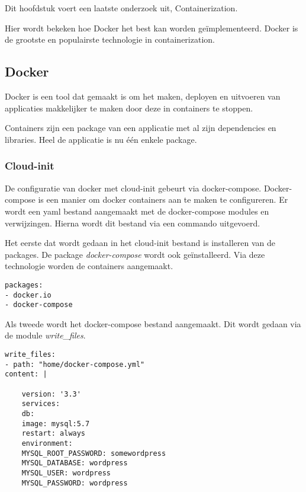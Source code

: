 \chapter{}
\label{ch:container}
Dit hoofdstuk voert een laatste onderzoek uit, Containerization.

Hier wordt bekeken hoe Docker het best kan worden geïmplementeerd. Docker is de grootste en populairste technologie in containerization.

\section{Docker}
Docker is een tool dat gemaakt is om het maken, deployen en uitvoeren van applicaties makkelijker te maken door deze in containers te stoppen. 

Containers zijn een package van een applicatie met al zijn dependencies en libraries. Heel de applicatie is nu één enkele package. \autocite{docker}

\subsection{Cloud-init}
De configuratie van docker met cloud-init gebeurt via docker-compose. Docker-compose is een manier om docker containers aan te maken te configureren. Er wordt een yaml bestand aangemaakt met de docker-compose modules en verwijzingen. Hierna wordt dit bestand via een commando uitgevoerd.

Het eerste dat wordt gedaan in het cloud-init bestand is installeren van de packages. De package \textit{docker-compose} wordt ook geïnstalleerd. Via deze technologie worden de containers aangemaakt.
\newpage
\begin{lstlisting}[basicstyle=\small]
packages:
- docker.io
- docker-compose
\end{lstlisting}

Als tweede wordt het docker-compose bestand aangemaakt. Dit wordt gedaan via de module \textit{write\_files}. 
\begin{lstlisting}[basicstyle=\small]
write_files:
- path: "home/docker-compose.yml"
content: |

    version: '3.3'
    services:
    db:
    image: mysql:5.7
    restart: always
    environment:
    MYSQL_ROOT_PASSWORD: somewordpress
    MYSQL_DATABASE: wordpress
    MYSQL_USER: wordpress
    MYSQL_PASSWORD: wordpress
\end{lstlisting}

